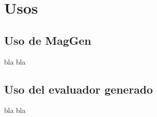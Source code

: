 \chapter{Usos}
\label{chap:usos}
\minitoc



\section{Uso de MagGen}
bla bla

\section{Uso del evaluador generado}
bla bla